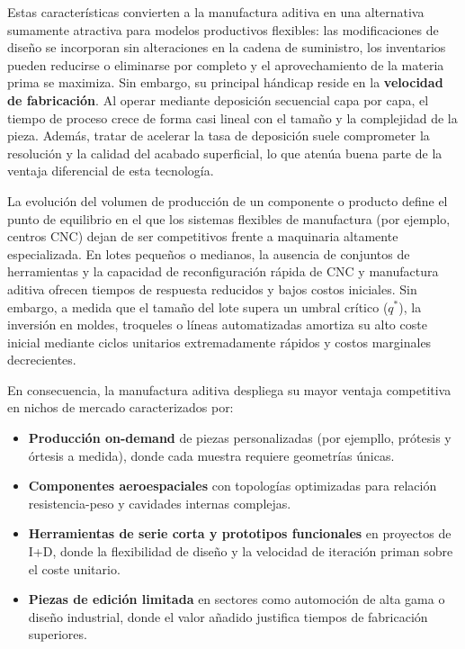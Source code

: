 Estas características convierten a la manufactura aditiva en una alternativa sumamente atractiva para modelos productivos flexibles: las modificaciones de diseño se incorporan sin alteraciones en la cadena de suministro, los inventarios pueden reducirse o eliminarse por completo y el aprovechamiento de la materia prima se maximiza. Sin embargo, su principal hándicap reside en la \textbf{velocidad de fabricación}. Al operar mediante deposición secuencial capa por capa, el tiempo de proceso crece de forma casi lineal con el tamaño y la complejidad de la pieza. Además, tratar de acelerar la tasa de deposición suele comprometer la resolución y la calidad del acabado superficial, lo que atenúa buena parte de la ventaja diferencial de esta tecnología.

La evolución del volumen de producción de un componente o producto define el punto de equilibrio en el que los sistemas flexibles de manufactura (por ejemplo, centros CNC) dejan de ser competitivos frente a maquinaria altamente especializada. En lotes pequeños o medianos, la ausencia de conjuntos de herramientas y la capacidad de reconfiguración rápida de CNC y manufactura aditiva ofrecen tiempos de respuesta reducidos y bajos costos iniciales. Sin embargo, a medida que el tamaño del lote supera un umbral crítico (\(q^*\)), la inversión en moldes, troqueles o líneas automatizadas amortiza su alto coste inicial mediante ciclos unitarios extremadamente rápidos y costos marginales decrecientes.  

En consecuencia, la manufactura aditiva despliega su mayor ventaja competitiva en nichos de mercado caracterizados por:

\begin{itemize}
  \item \textbf{Producción on-demand} de piezas personalizadas (por ejempllo, prótesis y órtesis a medida), donde cada muestra requiere geometrías únicas.  
  \item \textbf{Componentes aeroespaciales} con topologías optimizadas para relación resistencia-peso y cavidades internas complejas.  
  \item \textbf{Herramientas de serie corta y prototipos funcionales} en proyectos de I+D, donde la flexibilidad de diseño y la velocidad de iteración priman sobre el coste unitario.  
  \item \textbf{Piezas de edición limitada} en sectores como automoción de alta gama o diseño industrial, donde el valor añadido justifica tiempos de fabricación superiores.
\end{itemize}  

